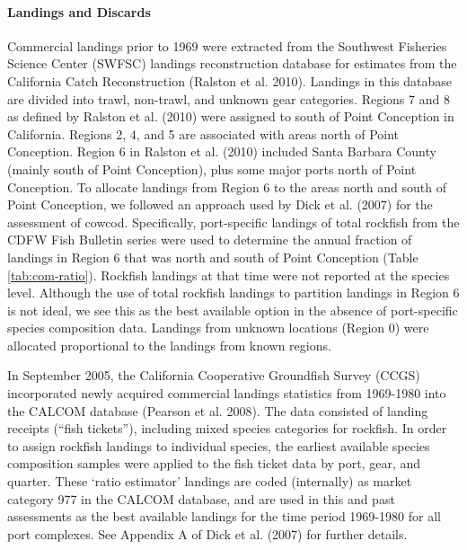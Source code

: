 \documentclass[11pt,
  english,
  letterpaper,
]{article}
\begin{document}
\hypertarget{landings-and-discards}{%
\paragraph{Landings and Discards}\label{landings-and-discards}}

\hfill\break

Commercial landings prior to 1969 were extracted from the Southwest Fisheries Science Center (SWFSC) landings reconstruction database for estimates from the California Catch Reconstruction (Ralston et al. 2010). Landings in this database are divided into trawl, non-trawl, and unknown gear categories. Regions 7 and 8 as defined by Ralston et al. (2010) were assigned to south of Point Conception in California. Regions 2, 4, and 5 are associated with areas north of Point Conception. Region 6 in Ralston et al. (2010) included Santa Barbara County (mainly south of Point Conception), plus some major ports north of Point Conception. To allocate landings from Region 6 to the areas north and south of Point Conception, we followed an approach used by Dick et al. (2007) for the assessment of cowcod. Specifically, port-specific landings of total rockfish from the CDFW Fish Bulletin series were used to determine the annual fraction of landings in Region 6 that was north and south of Point Conception (Table \ref{tab:com-ratio}). Rockfish landings at that time were not reported at the species level. Although the use of total rockfish landings to partition landings in Region 6 is not ideal, we see this as the best available option in the absence of port-specific species composition data. Landings from unknown locations (Region 0) were allocated proportional to the landings from known regions.

In September 2005, the California Cooperative Groundfish Survey (CCGS) incorporated newly acquired commercial landings statistics from 1969-1980 into the CALCOM database (Pearson et al. 2008). The data consisted of landing receipts (``fish tickets''), including mixed species categories for rockfish. In order to assign rockfish landings to individual species, the earliest available species composition samples were applied to the fish ticket data by port, gear, and quarter. These `ratio estimator' landings are coded (internally) as market category 977 in the CALCOM database, and are used in this and past assessments as the best available landings for the time period 1969-1980 for all port complexes. See Appendix A of Dick et al. (2007) for further details.
\end{document}
